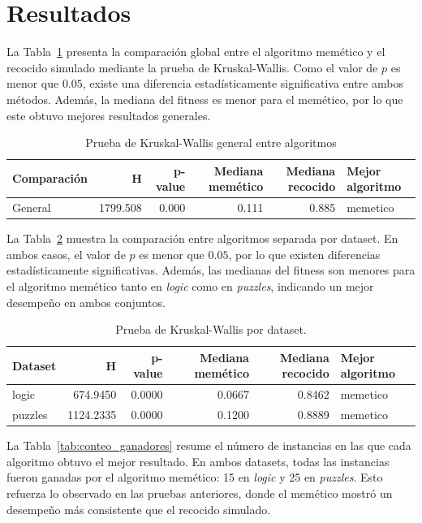 \documentclass{article}
\begin{document}
\section{Resultados}
La Tabla~\ref{tab:kw_general} presenta la comparación global entre el algoritmo memético y el recocido simulado mediante la prueba de Kruskal-Wallis. Como el valor de \(p\) es menor que \(0.05\), existe una diferencia estadísticamente significativa entre ambos métodos. Además, la mediana del fitness es menor para el memético, por lo que este obtuvo mejores resultados generales.\begin{table}
\caption{Prueba de Kruskal-Wallis general entre algoritmos}
\label{tab:kw_general}
\begin{tabular}{lrrrrl}
\toprule
Comparación & H & p-value & Mediana memético & Mediana recocido & Mejor algoritmo \\
\midrule
General & 1799.508 & 0.000 & 0.111 & 0.885 & memetico \\
\bottomrule
\end{tabular}
\end{table}

La Tabla~\ref{tab:kw_dataset} muestra la comparación entre algoritmos separada por dataset. En ambos casos, el valor de \(p\) es menor que \(0.05\), por lo que existen diferencias estadísticamente significativas. Además, las medianas del fitness son menores para el algoritmo memético tanto en \textit{logic} como en \textit{puzzles}, indicando un mejor desempeño en ambos conjuntos.
\begin{table}
\caption{Prueba de Kruskal-Wallis por dataset.}
\label{tab:kw_dataset}
\begin{tabular}{lrrrrl}
\toprule
Dataset & H & p-value & Mediana memético & Mediana recocido & Mejor algoritmo \\
\midrule
logic & 674.9450 & 0.0000 & 0.0667 & 0.8462 & memetico \\
puzzles & 1124.2335 & 0.0000 & 0.1200 & 0.8889 & memetico \\
\bottomrule
\end{tabular}
\end{table}

La Tabla~\ref{tab:conteo_ganadores} resume el número de instancias en las que cada algoritmo obtuvo el mejor resultado. En ambos datasets, todas las instancias fueron ganadas por el algoritmo memético: 15 en \textit{logic} y 25 en \textit{puzzles}. Esto refuerza lo observado en las pruebas anteriores, donde el memético mostró un desempeño más consistente que el recocido simulado.
\end{document}
